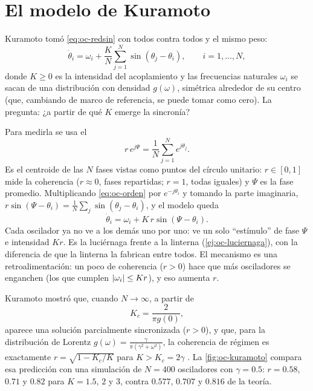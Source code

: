 \section{El modelo de Kuramoto}
\label{sec:oc-kuramoto}

Kuramoto tomó \eqref{eq:oc-redsin} con todos contra todos y el mismo peso:
\begin{equation}
  \dot\theta_i=\omega_i+\frac KN\sum_{j=1}^N\sin(\theta_j-\theta_i),\qquad i=1,\dots,N,
  \label{eq:oc-kuramoto}
\end{equation}
donde $K\ge0$ es la intensidad del acoplamiento y las frecuencias naturales $\omega_i$ se sacan de una distribución con densidad $g(\omega)$, simétrica alrededor de su centro (que, cambiando de marco de referencia, se puede tomar como cero). La pregunta: ¿a partir de qué $K$ emerge la sincronía?

Para medirla se usa el 
\begin{equation}
  r\,e^{j\Psi}=\frac1N\sum_{j=1}^Ne^{j\theta_j} .
  \label{eq:oc-orden}
\end{equation}
Es el centroide de las $N$ fases vistas como puntos del círculo unitario: $r\in[0,1]$ mide la coherencia ($r\approx0$, fases repartidas; $r=1$, todas iguales) y $\Psi$ es la fase promedio. Multiplicando \eqref{eq:oc-orden} por $e^{-j\theta_i}$ y tomando la parte imaginaria, $r\sin(\Psi-\theta_i)=\frac1N\sum_j\sin(\theta_j-\theta_i)$, y el modelo queda
\begin{equation}
  \dot\theta_i=\omega_i+K\,r\sin(\Psi-\theta_i) .
  \label{eq:oc-campomedio}
\end{equation}
Cada oscilador ya no ve a los demás uno por uno: ve un solo ``estímulo'' de fase $\Psi$ e intensidad $Kr$. Es la luciérnaga frente a la linterna (\cref{ej:oc-luciernaga}), con la diferencia de que la linterna la fabrican entre todos. El mecanismo es una retroalimentación: un poco de coherencia ($r>0$) hace que más osciladores se enganchen (los que cumplen $\left\lvert \omega_i\right\rvert\le Kr$), y eso aumenta $r$.

Kuramoto mostró que, cuando $N\to\infty$, a partir de
\begin{equation}
  K_c=\frac2{\pi g(0)},
  \label{eq:oc-Kc}
\end{equation}
aparece una solución parcialmente sincronizada ($r>0$), y que, para la distribución de Lorentz $g(\omega)=\frac{\gamma}{\pi(\gamma^2+\omega^2)}$, la coherencia de régimen es exactamente $r=\sqrt{1-K_c/K}$ para $K>K_c=2\gamma$ \citep{Kur84}. La \cref{fig:oc-kuramoto} compara esa predicción con una simulación de $N=400$ osciladores con $\gamma=0.5$: $r=0.58$, $0.71$ y $0.82$ para $K=1.5$, $2$ y $3$, contra $0.577$, $0.707$ y $0.816$ de la teoría.

